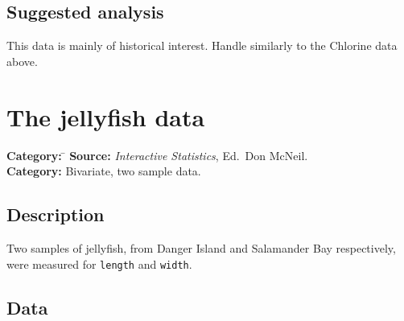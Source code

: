 \documentclass{article}
\newcommand{\code}[1]{\texttt{#1}}
\begin{document}
\subsection*{Suggested analysis}
This data is mainly of historical interest.  Handle similarly to the
Chlorine data above.

\clearpage\section{The jellyfish data}
\begin{tabbing}
\textbf{Category:} \= \kill
\textbf{Source:} \> \textit{Interactive Statistics}, Ed.\ Don McNeil.\\
\textbf{Category:} \> Bivariate, two sample data.
\end{tabbing}

\subsection*{Description}
Two samples of jellyfish, from Danger Island and Salamander Bay
respectively, were measured for \code{length} and \code{width}.

\subsection*{Data}
\end{document}
